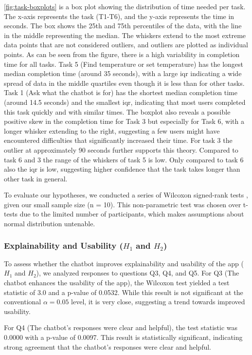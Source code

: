 \cref{fig:task-boxplots} is a box plot showing the distribution of time needed per task. The x-axis represents the task (T1-T6), and the y-axis represents the time in seconds. The box shows the 25th and 75th percentiles of the data, with the line in the middle representing the median. The whiskers extend to the most extreme data points that are not considered outliers, and outliers are plotted as individual points. As can be seen from the figure, there is a high variability in completion time for all tasks. Task 5 (Find temperature or set temperature) has the longest median completion time (around 35 seconds), with a large \gls{iqr}  indicating a wide spread of data in the middle quartiles even though it is less than for other tasks. Task 1 (Ask what the chatbot is for) has the shortest median completion time (around 14.5 seconds) and the smallest \gls{iqr}, indicating that most users completed this task quickly and with similar times.
The boxplot also reveals a possible positive skew in the completion time for Task 3 but especially for Task 6, with a longer whisker extending to the right, suggesting a few users might have encountered difficulties that significantly increased their time.
For task 3 the outlier at approximately 90 seconds further supports this theory.
Compared to task 6 and 3 the range of the whiskers of task 5 is low. Only compared to task 6 also the \gls{iqr} is low, suggesting higher confidence that the task takes longer than other task in general.

To evaluate our hypotheses, we conducted a series of Wilcoxon signed-rank tests \cite{sheskin2011handbook}, given our small sample size (n = 10). This non-parametric test was chosen over t-tests due to the limited number of participants, which makes assumptions about normal distribution untenable.
\subsubsection{Explainability and Usability (\(H_1\) and \(H_2\))}
To assess whether the chatbot improves explainability and usability of the app (\(H_1\) and \(H_2\)), we analyzed responses to questions Q3, Q4, and Q5.
For Q3 (The chatbot enhances the usability of the app), the Wilcoxon test yielded a test statistic of 3.0 and a p-value of 0.0532. While this result is not significant at the conventional $\alpha = 0.05$ level, it is very close, suggesting a trend towards improved usability.

For Q4 (The chatbot's responses were clear and helpful), the test statistic was 0.0000 with a p-value of 0.0097. This result is statistically significant, indicating strong agreement that the chatbot's responses were clear and helpful.

